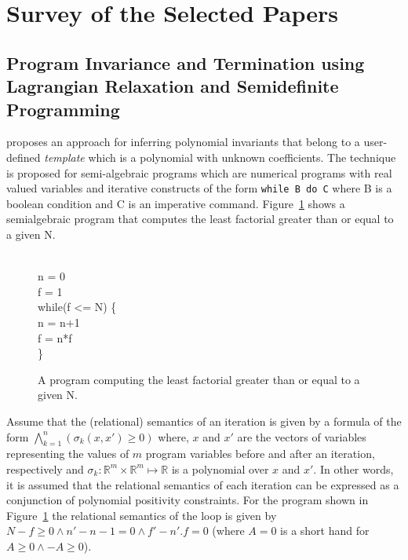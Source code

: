 \newcommand{\real}{\mathbb{R}}
\newcommand{\lmige}{\succcurlyeq}

\section{Survey of the Selected Papers}

\subsection{Program Invariance and Termination using Lagrangian Relaxation and Semidefinite Programming} \label{sec:paper1}

\cite{cousot:VMCAI05} proposes an approach for inferring polynomial invariants that belong to a user-defined \emph{template} which is a polynomial with unknown coefficients.
The technique is proposed for semi-algebraic programs which are numerical programs with real valued variables 
and iterative constructs of the form \texttt{while B do C} where B is a boolean condition 
and C is an imperative command. Figure~\ref{fig:SAprogram} shows a semialgebraic program that computes the least factorial greater than or equal to a given N.
%
\begin{figure}
\begin{myprogram}
\\
\pnl \>  n = 0 \\
\pnl \> f = 1 \\
\pnl \> while(f <= N) \{ \\
\pnl \> \> n = n+1 \\
\pnl \> \> f = n*f \\
\pnl \> \}
\end{myprogram}
\caption{A program computing the least factorial greater than or equal to a given N.} \label{fig:SAprogram}
\end{figure}
%
Assume that the (relational) semantics of an iteration is given by a formula of the form
$\bigwedge \limits_{k=1}^{n} (\sigma_k(x,x') \ge 0)$ where, $x$ and $x'$ are the vectors of
variables representing the values of $m$ program variables before and after an iteration, respectively 
and $\sigma_k : \real^m \times \real^m \mapsto \real$ is a polynomial over $x$ and $x'$. 
In other words, it is assumed that the relational semantics of each
iteration can be expressed as a conjunction of polynomial positivity constraints.
For the program shown in Figure~\ref{fig:SAprogram} the relational semantics of the 
loop is given by $N-f \ge 0 \wedge n' -n -1 = 0 \wedge f' - n'.f = 0$ (where 
$A = 0$ is a short hand for $A \ge 0 \wedge -A \ge 0$).

